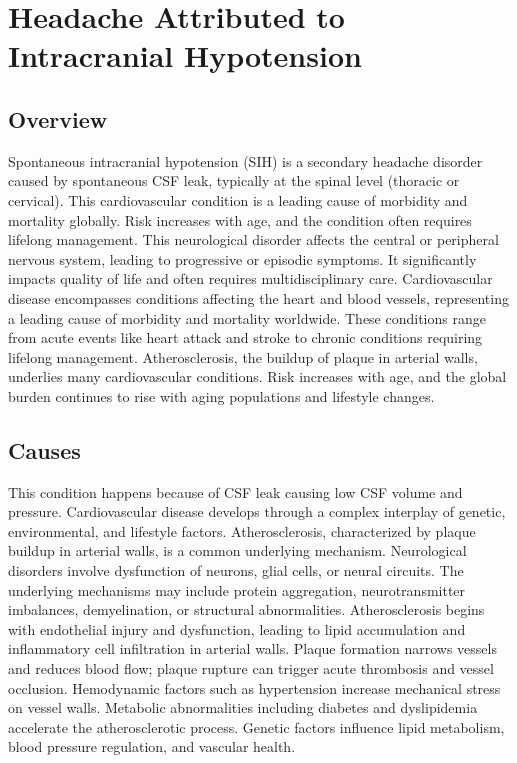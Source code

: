 \chapter{Headache Attributed to Intracranial Hypotension}
\label{sec:Headache Intracranial Hypotension}

\section{Overview}
Spontaneous intracranial hypotension (SIH) is a secondary headache disorder caused by spontaneous CSF leak, typically at the spinal level (thoracic or cervical). This cardiovascular condition is a leading cause of morbidity and mortality globally. Risk increases with age, and the condition often requires lifelong management. This neurological disorder affects the central or peripheral nervous system, leading to progressive or episodic symptoms. It significantly impacts quality of life and often requires multidisciplinary care. Cardiovascular disease encompasses conditions affecting the heart and blood vessels, representing a leading cause of morbidity and mortality worldwide. These conditions range from acute events like heart attack and stroke to chronic conditions requiring lifelong management. Atherosclerosis, the buildup of plaque in arterial walls, underlies many cardiovascular conditions. Risk increases with age, and the global burden continues to rise with aging populations and lifestyle changes.
\section{Causes}
This condition happens because of CSF leak causing low CSF volume and pressure. Cardiovascular disease develops through a complex interplay of genetic, environmental, and lifestyle factors. Atherosclerosis, characterized by plaque buildup in arterial walls, is a common underlying mechanism. Neurological disorders involve dysfunction of neurons, glial cells, or neural circuits. The underlying mechanisms may include protein aggregation, neurotransmitter imbalances, demyelination, or structural abnormalities. Atherosclerosis begins with endothelial injury and dysfunction, leading to lipid accumulation and inflammatory cell infiltration in arterial walls. Plaque formation narrows vessels and reduces blood flow; plaque rupture can trigger acute thrombosis and vessel occlusion. Hemodynamic factors such as hypertension increase mechanical stress on vessel walls. Metabolic abnormalities including diabetes and dyslipidemia accelerate the atherosclerotic process. Genetic factors influence lipid metabolism, blood pressure regulation, and vascular health.
